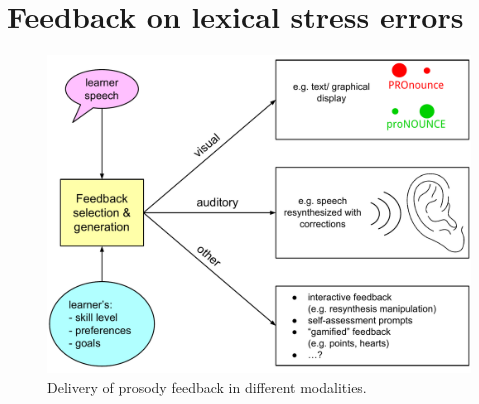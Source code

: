 %
%
\chapter{Feedback on lexical stress errors}
\label{chap:feedback}


\blindtext 

\begin{figure}[htb]
	\includegraphics[width=\textwidth]{../img/feedback}
	\caption{Delivery of prosody feedback in different modalities.}
	\label{fig:feedback}
\end{figure}
